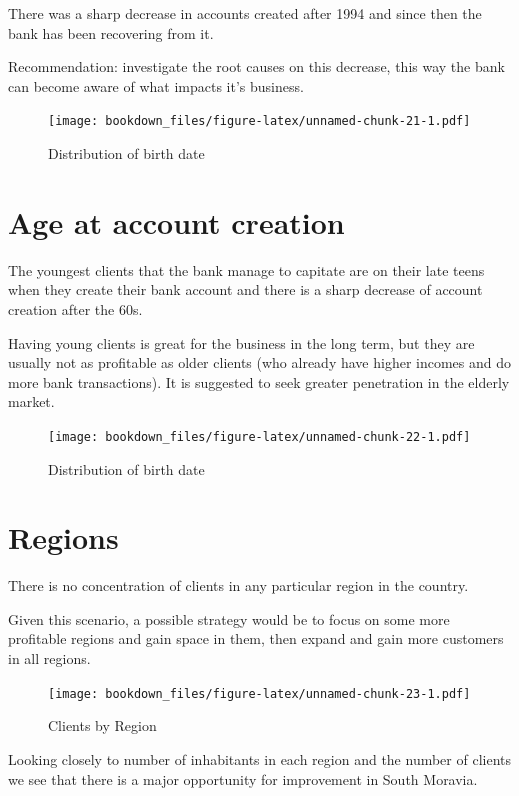 \documentclass[]{book}
\begin{document}
There was a sharp decrease in accounts created after 1994 and since then
the bank has been recovering from it.

Recommendation: investigate the root causes on this decrease, this way
the bank can become aware of what impacts it's business.

\begin{figure}
\centering
\texttt{[image: bookdown\_files/figure-latex/unnamed-chunk-21-1.pdf]}
\caption{\label{fig:unnamed-chunk-21}Distribution of birth date}
\end{figure}

\section{Age at account creation}\label{age-at-account-creation}

The youngest clients that the bank manage to capitate are on their late
teens when they create their bank account and there is a sharp decrease
of account creation after the 60s.

Having young clients is great for the business in the long term, but
they are usually not as profitable as older clients (who already have
higher incomes and do more bank transactions). It is suggested to seek
greater penetration in the elderly market.

\begin{figure}
\centering
\texttt{[image: bookdown\_files/figure-latex/unnamed-chunk-22-1.pdf]}
\caption{\label{fig:unnamed-chunk-22}Distribution of birth date}
\end{figure}

\section{Regions}\label{regions}

There is no concentration of clients in any particular region in the
country.

Given this scenario, a possible strategy would be to focus on some more
profitable regions and gain space in them, then expand and gain more
customers in all regions.

\begin{figure}
\centering
\texttt{[image: bookdown\_files/figure-latex/unnamed-chunk-23-1.pdf]}
\caption{\label{fig:unnamed-chunk-23}Clients by Region}
\end{figure}

Looking closely to number of inhabitants in each region and the number
of clients we see that there is a major opportunity for improvement in
South Moravia.
\end{document}
